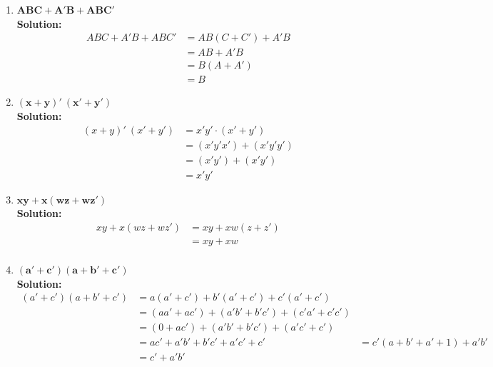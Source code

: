 \documentclass[table]{article}
\begin{document}
\begin{enumerate}[label=\textbf{\arabic*.}]
    \begin{enumerate}[label=\textbf{\alph*.}]
        \item \(\mathbf{ABC + A'B + ABC'}\) \\
        
        \textbf{Solution:} \\
        
        \begin{align*}
            ABC + A'B + ABC' & = AB(C + C') + A'B \\
            & = AB + A'B \\
            & = B(A + A') \\
            & = B
        \end{align*}

        \item \(\mathbf{\left(x+y\right)' \ \left(x' + y'\right)}\) \\
        
        \textbf{Solution:} \\

        \begin{align*}
            \left(x+y\right)' \ \left(x' + y'\right) &= x'y' \cdot \left(x'+y'\right) \\
            &= (x'y'x') + (x'y'y') \\
            &= (x'y') + (x'y') \\
            &= x'y'
        \end{align*}


        \item \(\mathbf{xy + x \left(wz + wz'\right)}\) \\
        
        \textbf{Solution:} \\

        \begin{align*}
            xy + x \left(wz + wz'\right) &= xy + xw(z + z') \\
            &= xy + xw \\
        \end{align*}

        \item \(\mathbf{\left(a' + c'\right)\left(a + b' + c'\right)}\) \\
        
        \textbf{Solution:} \\

        \begin{align*}
            (a' + c')(a + b' + c') &= a(a' + c') + b'(a' + c') + c'(a' + c') \\
            &= (aa' + ac') + (a'b' + b'c') + (c'a' + c'c')\\
            &= (0 + ac') + (a'b' + b'c') + (a'c' + c') \\
            &= ac' + a'b' + b'c' + a'c' + c'
            &= c'(a + b' + a' + 1) + a'b' \\
            &= c' + a'b'
        \end{align*}




\end{enumerate}
\end{enumerate}
\end{document}
